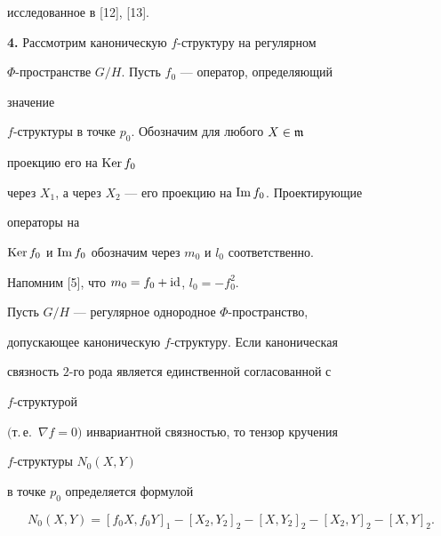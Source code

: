 исследованное в [12], [13]. 


\medskip 


 


{\bf 4.} Рассмотрим каноническую $f$-структуру на регулярном  


$\Phi$-пространстве $G/H$. Пусть $f_0$ --- оператор, определяющий 


значение 


$f$-структуры в точке $p_0$. Обозначим для любого $X\in\frak m$ 


проекцию его на $\operatorname{Ker} f_0$ 


через $X_1$, а через $X_2$ --- его проекцию на $\operatorname{Im} f_0$. Проектирующие 


операторы на 


$\operatorname{Ker} f_0$ и $\operatorname{Im} f_0$ обозначим через $m_0$ и $l_0$ соответственно. 


Напомним [5], что $m_0=f_0+\operatorname{id}$, $l_0=-f^2_0$. 


 


\begin{thm} Пусть $G/H$ --- регулярное однородное $\Phi$-пространство, 


допускающее каноническую $f$-структуру. Если каноническая 


связность $2$-го рода является единственной согласованной с


$f$-структурой 


$($т.\,е.~$\nabla f=0)$ инвариантной связностью, то тензор кручения 


$f$-структуры $N_0(X,Y)$ 


в точке $p_0$ определяется формулой 


\begin{equation} 


N_0(X,Y)=[f_0X,f_0Y]_1-[X_2,Y_2]_2-[X,Y_2]_2- 


[X_2,Y]_2-[X,Y]_2. 


\end{equation} 


\end{thm} 


 


